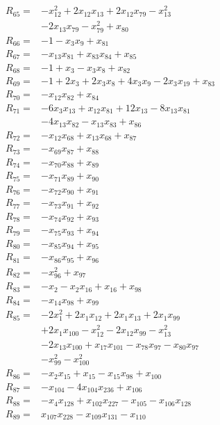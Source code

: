 \begin{align*}
R_{65}={}&-x_{12}^{2} +2x_{12}x_{13} +2x_{12}x_{79} -x_{13}^{2}\\
&-2x_{13}x_{79} -x_{79}^{2} +x_{80}\\[3pt]
R_{66}={}&-1 -x_{3}x_{9} +x_{81}\\[3pt]
R_{67}={}&-x_{13}x_{81} +x_{83}x_{84} +x_{85}\\[3pt]
R_{68}={}&-1 +x_{3} -x_{3}x_{8} +x_{82}\\[3pt]
R_{69}={}&-1 +2x_{3} +2x_{3}x_{8} +4x_{3}x_{9} -2x_{3}x_{19} +x_{83}\\[3pt]
R_{70}={}&-x_{12}x_{82} +x_{84}\\[3pt]
R_{71}={}&-6x_{3}x_{13} +x_{12}x_{81} +12x_{13} -8x_{13}x_{81}\\
&-4x_{13}x_{82} -x_{13}x_{83} +x_{86}\\[3pt]
R_{72}={}&-x_{12}x_{68} +x_{13}x_{68} +x_{87}\\[3pt]
R_{73}={}&-x_{69}x_{87} +x_{88}\\[3pt]
R_{74}={}&-x_{70}x_{88} +x_{89}\\[3pt]
R_{75}={}&-x_{71}x_{89} +x_{90}\\[3pt]
R_{76}={}&-x_{72}x_{90} +x_{91}\\[3pt]
R_{77}={}&-x_{73}x_{91} +x_{92}\\[3pt]
R_{78}={}&-x_{74}x_{92} +x_{93}\\[3pt]
R_{79}={}&-x_{75}x_{93} +x_{94}\\[3pt]
R_{80}={}&-x_{85}x_{94} +x_{95}\\[3pt]
R_{81}={}&-x_{86}x_{95} +x_{96}\\[3pt]
R_{82}={}&-x_{96}^{2} +x_{97}\\[3pt]
R_{83}={}&-x_{2} -x_{2}x_{16} +x_{16} +x_{98}\\[3pt]
R_{84}={}&-x_{14}x_{98} +x_{99}\\[3pt]
R_{85}={}&-2x_{1}^{2} +2x_{1}x_{12} +2x_{1}x_{13} +2x_{1}x_{99}\\
&+2x_{1}x_{100} -x_{12}^{2} -2x_{12}x_{99} -x_{13}^{2}\\
&-2x_{13}x_{100} +x_{17}x_{101} -x_{78}x_{97} -x_{80}x_{97}\\
&-x_{99}^{2} -x_{100}^{2}\\[3pt]
R_{86}={}&-x_{2}x_{15} +x_{15} -x_{15}x_{98} +x_{100}\\[3pt]
R_{87}={}&-x_{104} -4x_{104}x_{236} +x_{106}\\[3pt]
R_{88}={}&-x_{4}x_{128} +x_{102}x_{227} -x_{105} -x_{106}x_{128}\\[3pt]
R_{89}={}&x_{107}x_{228} -x_{109}x_{131} -x_{110}\\[3pt]

\end{align*}
